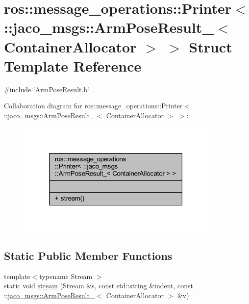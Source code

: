 \hypertarget{structros_1_1message__operations_1_1Printer_3_01_1_1jaco__msgs_1_1ArmPoseResult___3_01ContainerAllocator_01_4_01_4}{}\section{ros\+:\+:message\+\_\+operations\+:\+:Printer$<$ \+:\+:jaco\+\_\+msgs\+:\+:Arm\+Pose\+Result\+\_\+$<$ Container\+Allocator $>$ $>$ Struct Template Reference}
\label{structros_1_1message__operations_1_1Printer_3_01_1_1jaco__msgs_1_1ArmPoseResult___3_01ContainerAllocator_01_4_01_4}


{\ttfamily \#include \char`\"{}Arm\+Pose\+Result.\+h\char`\"{}}



Collaboration diagram for ros\+:\+:message\+\_\+operations\+:\+:Printer$<$ \+:\+:jaco\+\_\+msgs\+:\+:Arm\+Pose\+Result\+\_\+$<$ Container\+Allocator $>$ $>$\+:
\nopagebreak
\begin{figure}[H]
\begin{center}
\leavevmode
\includegraphics[width=283pt]{d4/dc5/structros_1_1message__operations_1_1Printer_3_01_1_1jaco__msgs_1_1ArmPoseResult___3_01ContainerAllocator_01_4_01_4__coll__graph}
\end{center}
\end{figure}
\subsection*{Static Public Member Functions}
\begin{DoxyCompactItemize}
\item 
{\footnotesize template$<$typename Stream $>$ }\\static void \hyperlink{structros_1_1message__operations_1_1Printer_3_01_1_1jaco__msgs_1_1ArmPoseResult___3_01ContainerAllocator_01_4_01_4_a08d2cf33c3794771e37d1aa3ce2f7abc}{stream} (Stream \&s, const std\+::string \&indent, const \+::\hyperlink{structjaco__msgs_1_1ArmPoseResult__}{jaco\+\_\+msgs\+::\+Arm\+Pose\+Result\+\_\+}$<$ Container\+Allocator $>$ \&v)
\end{DoxyCompactItemize}


